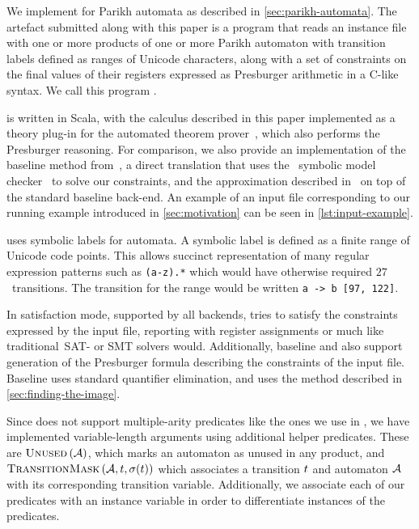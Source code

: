 \documentclass[acmsmall,review,anonymous,screen]{acmart}\settopmatter{printfolios=true,printccs=true,printacmref=true}
\theoremstyle{definition}
\begin{document}
We implement \Calculus{} for Parikh automata as described in
\cref{sec:parikh-automata}. The artefact submitted along with this paper is a
program that reads an instance file with one or more products of one or more
Parikh automaton with transition labels defined as ranges of Unicode characters,
along with a set of constraints on the final values of their registers expressed
as Presburger arithmetic in a C-like syntax. We call this program
\Catra.

\Catra{} is written in Scala, with the calculus described in this paper
implemented as a theory plug-in for the \Princess{} automated theorem
prover~\cite{princess}, which also performs the Presburger reasoning. For
comparison, we also provide an implementation of the baseline method
from~\cite{generate-parikh-image}, a direct translation that uses the~\Nuxmv{}
symbolic model checker~\cite{nuxmv} to solve our constraints, and the
approximation described in~\cite{approximate-parikh} on top of the standard
baseline back-end. An example of an input file corresponding to our running
example introduced in \cref{sec:motivation} can be seen in
\cref{lst:input-example}.

\Catra{} uses symbolic labels for automata. A symbolic label is defined as a
finite range of Unicode code points. This allows succinct representation of many
regular expression patterns such as \lstinline{(a-z).*} which would have
otherwise required $27$~transitions. The transition for the range would be
written \lstinline{a -> b [97, 122]}.

In satisfaction mode, supported by all backends, \Catra{} tries to satisfy the
constraints expressed by the input file, reporting \Sat{} with register
assignments or \Unsat{} much like traditional~SAT- or SMT solvers would.
Additionally, baseline and \Calculus{} also support generation of the Presburger
formula describing the constraints of the input file. Baseline uses standard
quantifier elimination, and \Calculus{} uses the method described in
\cref{sec:finding-the-image}.

Since \Princess{} does not support multiple-arity predicates like the ones we
use in \Calculus{}, we have implemented variable-length arguments using
additional helper predicates. These are $\operatorname{\textsc{Unused}}{}(\mathcal{A})$, which marks an
automaton as unused in any product, and $\operatorname{\textsc{TransitionMask}}{}(\mathcal{A},
t, \operatorname{\sigma}(t))$ which associates a transition $t$
and automaton $\mathcal{A}$ with its corresponding transition variable.
Additionally, we associate each of our predicates with an instance variable in
order to differentiate instances of the predicates.
\end{document}
